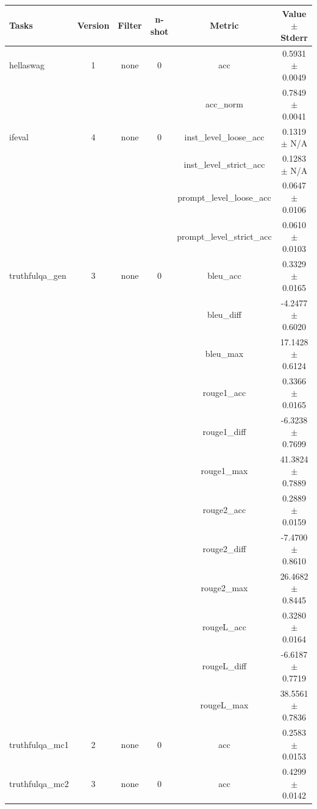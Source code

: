 \documentclass{ifacconf}
\begin{document}
\begin{strip}
\begin{minipage}{\textwidth}
			\begin{table}[H]
				\centering
				\begin{tabular}{|l|c|c|c|c|c|}
					\hline
					\textbf{Tasks} & \textbf{Version} & \textbf{Filter} & \textbf{n-shot} & \textbf{Metric} & \textbf{Value} $\pm$ \textbf{Stderr} \\ \hline
					hellaswag & 1 & none & 0 & acc & 0.5931 $\pm$ 0.0049 \\ \hline
					& & & & acc\_norm & 0.7849 $\pm$ 0.0041 \\ \hline
					ifeval & 4 & none & 0 & inst\_level\_loose\_acc & 0.1319 $\pm$ N/A \\ \hline
					& & & & inst\_level\_strict\_acc & 0.1283 $\pm$ N/A \\ \hline
					& & & & prompt\_level\_loose\_acc & 0.0647 $\pm$ 0.0106 \\ \hline
					& & & & prompt\_level\_strict\_acc & 0.0610 $\pm$ 0.0103 \\ \hline
					truthfulqa\_gen & 3 & none & 0 & bleu\_acc & 0.3329 $\pm$ 0.0165 \\ \hline
					& & & & bleu\_diff & -4.2477 $\pm$ 0.6020 \\ \hline
					& & & & bleu\_max & 17.1428 $\pm$ 0.6124 \\ \hline
					& & & & rouge1\_acc & 0.3366 $\pm$ 0.0165 \\ \hline
					& & & & rouge1\_diff & -6.3238 $\pm$ 0.7699 \\ \hline
					& & & & rouge1\_max & 41.3824 $\pm$ 0.7889 \\ \hline
					& & & & rouge2\_acc & 0.2889 $\pm$ 0.0159 \\ \hline
					& & & & rouge2\_diff & -7.4700 $\pm$ 0.8610 \\ \hline
					& & & & rouge2\_max & 26.4682 $\pm$ 0.8445 \\ \hline
					& & & & rougeL\_acc & 0.3280 $\pm$ 0.0164 \\ \hline
					& & & & rougeL\_diff & -6.6187 $\pm$ 0.7719 \\ \hline
					& & & & rougeL\_max & 38.5561 $\pm$ 0.7836 \\ \hline
					truthfulqa\_mc1 & 2 & none & 0 & acc & 0.2583 $\pm$ 0.0153 \\ \hline
					truthfulqa\_mc2 & 3 & none & 0 & acc & 0.4299 $\pm$ 0.0142 \\ \hline
				\end{tabular}
				\label{tab:llama31_awq}
			\end{table}
			

\end{minipage}
\end{strip}
\end{document}
